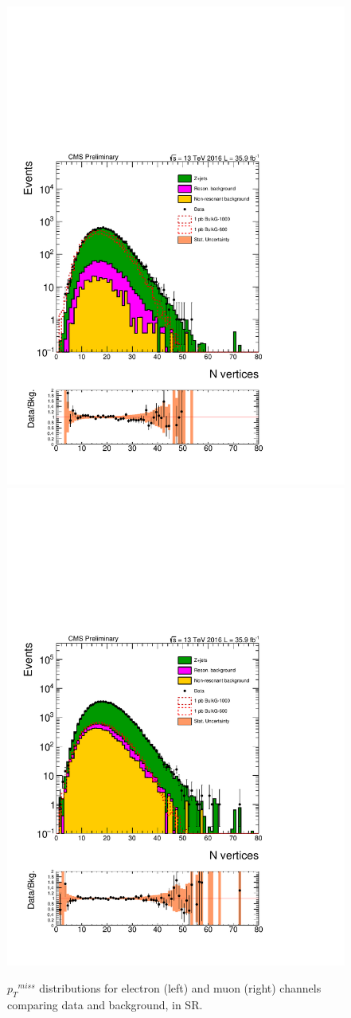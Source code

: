 \begin{figure}[htbp!]
\centering
\includegraphics[width=0.46\linewidth,page=18]{figures/ReMiniSummer16_DT_PhReMiniMCRcFixXsec_GMCPhPtWt_SRdPhiGT0p5_puWeightsummer16_muoneg_gjet_metfilter_unblind_el_log_1pb.pdf}
\includegraphics[width=0.46\linewidth,page=18]{figures/ReMiniSummer16_DT_PhReMiniMCRcFixXsec_GMCPhPtWt_SRdPhiGT0p5_puWeightsummer16_muoneg_gjet_metfilter_unblind_mu_log_1pb.pdf}
\caption{${p_{T}}^{miss}$ distributions for electron (left) and muon (right) channels
comparing data and background, in SR.}
\label{fit:SR_gjet_met_narrow}
\end{figure}

